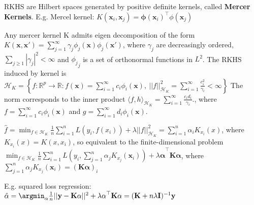 \begin{sectionbox}[RKHS]\nospacing{}
RKHS are Hilbert spaces generated by positive definite kernels, called \textbf{Mercer Kernels}. E.g. Mercel kernel: $K(\mathbf{x}_i,\mathbf{x}_j) = \mathbf\phi(\mathbf{x}_i)^\top\phi(\mathbf{x}_j)$



\end{sectionbox}
\begin{sectionbox}
Any mercer kernel K admits eigen decomposition of the form
$K(\mathbf{x}, \mathbf{x}') = \sum_{j=1}^{\infty} \gamma_j \phi_j(\mathbf{x}) \phi_j(\mathbf{x}')$, where $\gamma_j$ are decreasingly ordered, $\sum_{j\geq 1}|\gamma_j|^2<\infty$ and ${\phi_j}_j$ is a set of orthonormal functions in $L^2$. The RKHS induced by kernel is $\mathcal{H}_K = \left\{ f : \mathbb{R}^p \to \mathbb{R} : f(\mathbf{x}) = \sum_{i=1}^{\infty} c_i \phi_i(\mathbf{x}), \ ||f||_{\mathcal{H}_K}^2=\sum_{i=1}^{\infty} \frac{c_i^2}{\gamma_i} < \infty \right\}$ The norm corresponds to the inner product $\langle f, h \rangle_{\mathcal{H}_K} = \sum_{i=1}^{\infty} \frac{c_i d_i}{\gamma_i}.
$, where $f =  \sum_{i=1}^{\infty} c_i\phi_i(\mathbf{x})$ and $g =  \sum_{i=1}^{\infty} d_i\phi_i(\mathbf{x})$.

\end{sectionbox}
\begin{sectionbox}\nospacing{}
$\hat{f} = \min_{f\in \mathcal{H}_K}\frac1n\sum^n_{i=1}{L(y_i,f(x_i)) + \lambda ||{f}||_{\mathcal{H}_K}^2} = \sum_{i=1}^n\hat{\alpha_i}K_{x_i}(x)$, where $K_{x_i}(x)=K(x,x_i)$, so equivalent to the finite-dimensional problem $\min_{f\in \mathcal{H}_K}\frac1n\sum^n_{i=1}{L(y_i,\sum_{j=1}^n\alpha_jK_{x_j}(\mathbf{x}_i)) + \lambda \mathbf{\alpha}}^\top\mathbf{K}\mathbf{\alpha}$, where $\sum_{j=1}^n\alpha_jK_{x_j}(\mathbf{x}_i) = (\mathbf{K\alpha})_i$

E.g. squared loss regression: $\hat{\alpha} = \argmin_{\alpha}{\frac1n ||\mathbf{y} - \mathbf{K\alpha}||^2 + \mathbf{\lambda\alpha}^\top \mathbf{K\alpha}} = (\mathbf{K} + n\mathbf{\lambda I})^{-1}\mathbf{y}$

\end{sectionbox}